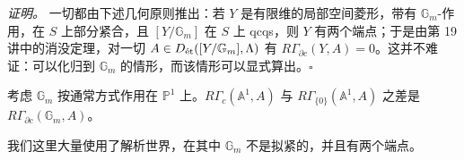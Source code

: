 \emph{证明。} 一切都由下述几何原则推出：若 $Y$ 是有限维的局部空间菱形，带有 $\mathbb{G}_m$-作用，在 $S$ 上部分紧合，且 $[Y/\mathbb{G}_m]$ 在 $S$ 上 qcqs，则 $Y$ 有两个端点；于是由第 19 讲中的消没定理，对一切 $A\in D_\et([Y/\mathbb{G}_m],\Lambda)$ 有 $R\Gamma_{\partial c}(Y,A)=0$。这并不难证：可以化归到 $\mathbb{G}_m$ 的情形，而该情形可以显式算出。\hfill$\square$

\begin{example}
考虑 $\mathbb{G}_m$ 按通常方式作用在 $\mathbb{P}^1$ 上。$R\Gamma_c(\mathbb{A}^1,A)$ 与 $R\Gamma_{\{0\}}(\mathbb{A}^1,A)$ 之差是 $R\Gamma_{\partial c}(\mathbb{G}_m,A)$。
\end{example}

\begin{remark}
我们这里大量使用了解析世界，在其中 $\mathbb{G}_m$ 不是拟紧的，并且有两个端点。
\end{remark}
